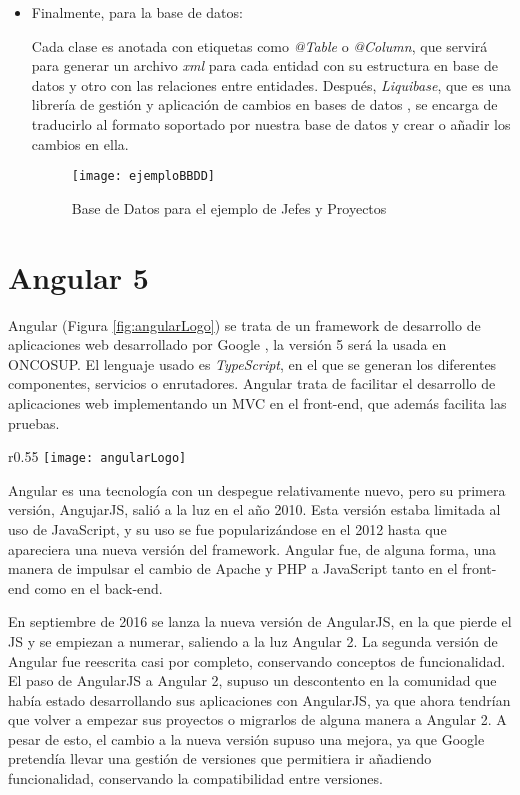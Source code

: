 \begin{itemize}
\item Finalmente, para la base de datos:

Cada clase es anotada con etiquetas como \emph{@Table} o \emph{@Column}, que servirá para generar un archivo \emph{xml} para cada entidad con su estructura en base de datos y otro con las relaciones entre entidades. Después, \emph{Liquibase}, que es una librería de gestión y aplicación de cambios en bases de datos \cite{liquibase}, se encarga de traducirlo al formato soportado por nuestra base de datos y crear o añadir los cambios en ella.

\begin{figure}[!h]
\begin{center}
\texttt{[image: ejemploBBDD]}
\caption{Base de Datos para el ejemplo de Jefes y Proyectos}
\label{fig:ejemploBBDD}
\end{center}
\end{figure}

\end{itemize}

\section{Angular 5}
\label{sec:Angular5}

Angular (Figura \ref{fig:angularLogo}) se trata de un framework de desarrollo de aplicaciones web desarrollado por Google \cite{angular}, la versión 5 será la usada en ONCOSUP. El lenguaje usado es \emph{TypeScript}, en el que se generan los diferentes componentes, servicios o enrutadores. Angular trata de facilitar el desarrollo de aplicaciones web implementando un MVC en el front-end, que además facilita las pruebas.

\begin{wrapfigure}{r}{0.55\textwidth} %
    \centering
    \texttt{[image: angularLogo]}
    \caption{Proyecto Angular}
    \label{fig:angularLogo}
\end{wrapfigure}
Angular es una tecnología con un despegue relativamente nuevo, pero su primera versión, AngujarJS, salió a la luz en el año 2010. Esta versión estaba limitada al uso de JavaScript, y su uso se fue popularizándose en el 2012 hasta que apareciera una nueva versión del framework. Angular fue, de alguna forma, una manera de impulsar el cambio de Apache y PHP a JavaScript tanto en el front-end como en el back-end.

En septiembre de 2016 se lanza la nueva versión de AngularJS, en la que pierde el JS y se empiezan a numerar, saliendo a la luz Angular 2. La segunda versión de Angular fue reescrita casi por completo, conservando conceptos de funcionalidad. El paso de AngularJS a Angular 2, supuso un descontento en la comunidad que había estado desarrollando sus aplicaciones con AngularJS, ya que ahora tendrían que volver a empezar sus proyectos o migrarlos de alguna manera a Angular 2. A pesar de esto, el cambio a la nueva versión supuso una mejora, ya que Google pretendía llevar una gestión de versiones que permitiera ir añadiendo funcionalidad, conservando la compatibilidad entre versiones.


